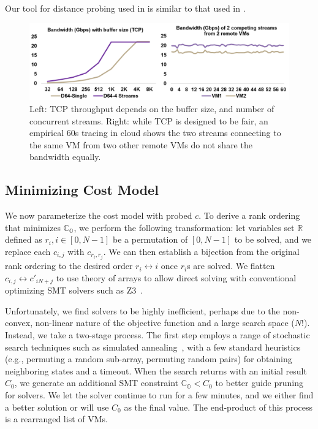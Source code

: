 Our tool for distance probing used in \cmpi is similar to that used in \plink.


\begin{figure}[t!]
	\centering
	\includegraphics[width=.6\linewidth]{Figures/tcpchartacteristics.png}
	\caption{Left: TCP throughput depends on the buffer size, and number of concurrent streams. Right: while TCP is designed to be fair, an empirical 60s tracing in cloud shows the two streams connecting to the same VM from two other remote VMs do not share the bandwidth equally.}
	\label{fig:tcpchartacteristics}
\end{figure}



\subsection{Minimizing Cost Model}
We now parameterize the cost model with probed $c$. To derive a rank ordering that minimizes $\mathbb{C_O}$, we perform the following transformation: let variables set $\mathbb{R}$ defined as $r_i, i \in [0,N-1]$ be a permutation of $[0,N-1]$ to be solved, and we replace each $c_{i,j}$ with $c_{r_i,r_j}$. We can then establish a bijection from the original rank ordering to the desired order $r_i \leftrightarrow i$ once $r_i$s are solved. We flatten $c_{i,j} \leftrightarrow c'_{iN + j}$ to use theory of arrays to allow direct solving with conventional optimizing SMT solvers such as Z3~\cite{de2008z3,ORToolsG24:online}. 

Unfortunately, we find solvers to be highly inefficient, perhaps due to the non-convex, non-linear nature of the objective function and a large search space ($N!$). Instead, we take a two-stage process. The first step employs a range of stochastic search techniques such as simulated annealing~\cite{simanneal}, with a few standard heuristics (e.g., permuting a random sub-array, permuting random pairs) for obtaining neighboring states and a timeout. When the search returns with an initial result $C_0$, we generate an additional SMT constraint $\mathbb{C_O} < C_0$ to better guide pruning for solvers. We let the solver continue to run for a few minutes, and we either find a better solution or will use $C_0$ as the final value. The end-product of this process is a rearranged list of VMs.